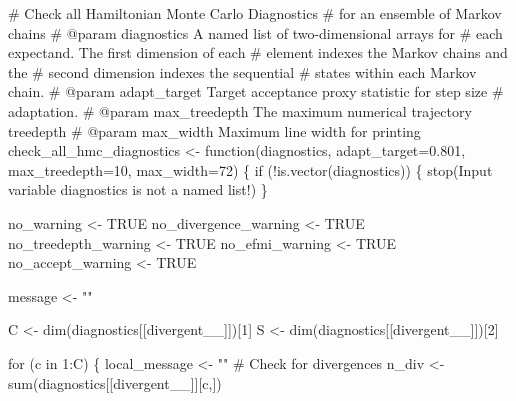 \documentclass[
  letterpaper,
  DIV=11,
  numbers=noendperiod]{scrartcl}
\newenvironment{Shaded}{\begin{snugshade}}{\end{snugshade}}
\newcommand{\BuiltInTok}[1]{\textcolor[rgb]{0.00,0.23,0.31}{#1}}
\newcommand{\CommentTok}[1]{\textcolor[rgb]{0.37,0.37,0.37}{#1}}
\newcommand{\ControlFlowTok}[1]{\textcolor[rgb]{0.00,0.23,0.31}{#1}}
\newcommand{\DecValTok}[1]{\textcolor[rgb]{0.68,0.00,0.00}{#1}}
\newcommand{\FloatTok}[1]{\textcolor[rgb]{0.68,0.00,0.00}{#1}}
\newcommand{\KeywordTok}[1]{\textcolor[rgb]{0.00,0.23,0.31}{#1}}
\newcommand{\NormalTok}[1]{\textcolor[rgb]{0.00,0.23,0.31}{#1}}
\newcommand{\OperatorTok}[1]{\textcolor[rgb]{0.37,0.37,0.37}{#1}}
\newcommand{\StringTok}[1]{\textcolor[rgb]{0.13,0.47,0.30}{#1}}
\begin{document}
\begin{Shaded}
\begin{Highlighting}[]
\CommentTok{\# Check all Hamiltonian Monte Carlo Diagnostics }
\CommentTok{\# for an ensemble of Markov chains}
\CommentTok{\# @param diagnostics A named list of two{-}dimensional arrays for }
\CommentTok{\#                    each expectand.  The first dimension of each}
\CommentTok{\#                    element indexes the Markov chains and the }
\CommentTok{\#                    second dimension indexes the sequential }
\CommentTok{\#                    states within each Markov chain.}
\CommentTok{\# @param adapt\_target Target acceptance proxy statistic for step size }
\CommentTok{\#                     adaptation.}
\CommentTok{\# @param max\_treedepth The maximum numerical trajectory treedepth}
\CommentTok{\# @param max\_width Maximum line width for printing}
\NormalTok{check\_all\_hmc\_diagnostics }\OperatorTok{\textless{}{-}}\NormalTok{ function(diagnostics,}
\NormalTok{                                      adapt\_target}\OperatorTok{=}\FloatTok{0.801}\NormalTok{,}
\NormalTok{                                      max\_treedepth}\OperatorTok{=}\DecValTok{10}\NormalTok{,}
\NormalTok{                                      max\_width}\OperatorTok{=}\DecValTok{72}\NormalTok{) \{}
  \ControlFlowTok{if}\NormalTok{ (}\OperatorTok{!}\KeywordTok{is}\NormalTok{.vector(diagnostics)) \{}
\NormalTok{    stop(}\StringTok{\textquotesingle{}Input variable \textasciigrave{}diagnostics\textasciigrave{} is not a named list!\textquotesingle{}}\NormalTok{)}
\NormalTok{  \}}
  
\NormalTok{  no\_warning }\OperatorTok{\textless{}{-}}\NormalTok{ TRUE}
\NormalTok{  no\_divergence\_warning }\OperatorTok{\textless{}{-}}\NormalTok{ TRUE}
\NormalTok{  no\_treedepth\_warning }\OperatorTok{\textless{}{-}}\NormalTok{ TRUE}
\NormalTok{  no\_efmi\_warning }\OperatorTok{\textless{}{-}}\NormalTok{ TRUE}
\NormalTok{  no\_accept\_warning }\OperatorTok{\textless{}{-}}\NormalTok{ TRUE}
  
\NormalTok{  message }\OperatorTok{\textless{}{-}} \StringTok{""}
  
\NormalTok{  C }\OperatorTok{\textless{}{-}}\NormalTok{ dim(diagnostics[[}\StringTok{\textquotesingle{}divergent\_\_\textquotesingle{}}\NormalTok{]])[}\DecValTok{1}\NormalTok{]}
\NormalTok{  S }\OperatorTok{\textless{}{-}}\NormalTok{ dim(diagnostics[[}\StringTok{\textquotesingle{}divergent\_\_\textquotesingle{}}\NormalTok{]])[}\DecValTok{2}\NormalTok{]}
  
  \ControlFlowTok{for}\NormalTok{ (c }\KeywordTok{in} \DecValTok{1}\NormalTok{:C) \{}
\NormalTok{    local\_message }\OperatorTok{\textless{}{-}} \StringTok{""}
    \CommentTok{\# Check for divergences}
\NormalTok{    n\_div }\OperatorTok{\textless{}{-}} \BuiltInTok{sum}\NormalTok{(diagnostics[[}\StringTok{\textquotesingle{}divergent\_\_\textquotesingle{}}\NormalTok{]][c,])}
    

\end{Highlighting}
\end{Shaded}
\end{document}
